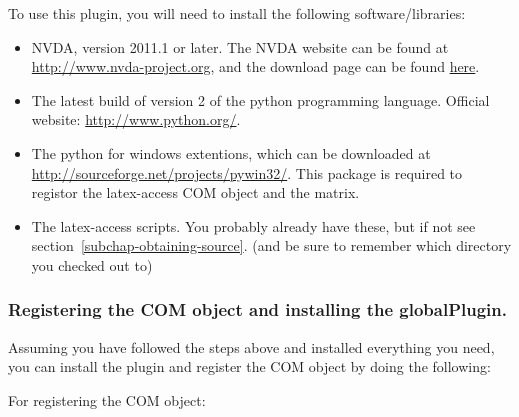 \documentclass[12pt,a4paper]{report}
\begin{document}
To use this plugin, you will need to install the following software/libraries:

\begin{itemize}
\item NVDA, version 2011.1 or later.  The NVDA website can be found at
  \url{http://www.nvda-project.org}, and the download page can be found 
  \href{http://www.nvda-project.org/download/}{here}.
\item The latest build of version
  2 of the python programming language.  Official website:
  \url{http://www.python.org/}.
\item The python for windows extentions, which
  can be downloaded at \url{http://sourceforge.net/projects/pywin32/}.  This
  package is required to registor the latex-access COM object and the
  matrix.
\item The latex-access scripts.  You probably already have these,
  but if not see section~\ref{subchap-obtaining-source}. (and be sure to remember
  which directory you checked out to)
\end{itemize}

\subsubsection{Registering the COM object and installing the globalPlugin.}

Assuming you have followed the steps above and installed everything you need, you can install the plugin and register the COM object by doing the following:

For registering the COM object:
\end{document}
